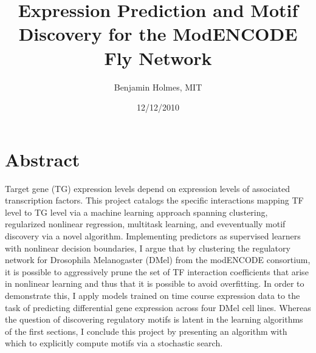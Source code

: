 \documentclass[12pt,a4paper]{article}
\begin{document}
\title{Expression Prediction and Motif Discovery for the ModENCODE Fly Network}
\date{12/12/2010}
\author{Benjamin Holmes, MIT}
\maketitle
\pagebreak

\section*{Abstract} 
\noindent Target gene (TG) expression levels depend on expression levels of associated transcription factors. This project catalogs the specific interactions mapping TF level to TG level via a machine learning approach spanning clustering, regularized nonlinear regression, multitask learning, and eveventually motif discovery via a novel algorithm. Implementing predictors as supervised learners with nonlinear decision boundaries, I argue that by clustering the regulatory network for Drosophila Melanogaster (DMel) from the modENCODE consortium, it is possible to aggressively prune the set of TF interaction coefficients that arise in nonlinear learning and thus that it is possible to avoid overfitting. In order to demonstrate this, I apply models trained on time course expression data to the task of predicting differential gene expression across four DMel cell lines. Whereas the question of discovering regulatory motifs is latent in the learning algorithms of the first sections, I conclude this project by presenting an algorithm with which to explicitly compute motifs via a stochastic search.
\end{document}
